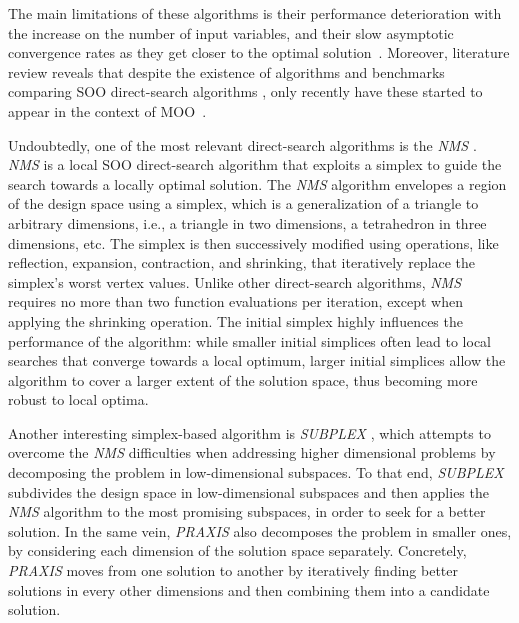 	The main limitations of these algorithms is their performance deterioration with the increase on the number of input variables, and their slow asymptotic convergence rates as they get closer to the optimal solution~\cite{Kolda2003}. Moreover, literature review reveals that despite the existence of algorithms and benchmarks comparing \ac{SOO} direct-search algorithms \cite{Waibel2018}, only recently have these started to appear in the context of \ac{MOO}~\cite{Custodio2010,Custodio2018}. 
	
	Undoubtedly, one of the most relevant direct-search algorithms is the \textit{\ac{NMS}} \cite{Nelder1964}. \textit{\ac{NMS}} is a local \ac{SOO} direct-search algorithm that exploits a simplex to guide the search towards a locally optimal solution. The \textit{\ac{NMS}} algorithm envelopes a region of the design space using a simplex, which is a generalization of a triangle to arbitrary dimensions, i.e., a triangle in two dimensions, a tetrahedron in three dimensions, etc. The simplex is then successively modified using operations, like reflection, expansion, contraction, and shrinking, that iteratively replace the simplex's worst vertex values. %
	Unlike other direct-search algorithms, \textit{\ac{NMS}} requires no more than two function evaluations per iteration, except when applying the shrinking operation. The initial simplex highly influences the performance of the algorithm: while smaller initial simplices often lead to local searches that converge towards a local optimum, larger initial simplices allow the algorithm to cover a larger extent of the solution space, thus becoming more robust to local optima.
	
	Another interesting simplex-based algorithm is \textit{SUBPLEX} \cite{Rowan1990}, which attempts to overcome the \textit{\ac{NMS}} difficulties when addressing higher dimensional problems by decomposing the problem in low\nobreakdash-\hspace{0pt}dimensional
	subspaces. To that end, \textit{SUBPLEX} subdivides the design space in low-dimensional subspaces and then applies the \textit{\ac{NMS}} algorithm to the most promising subspaces, in order to seek for a better solution. %
	In the same vein, \textit{\ac{PRAXIS}} \cite{Brent1973} also decomposes the problem in smaller ones, by considering each dimension of the solution space separately. Concretely, \textit{\ac{PRAXIS}} moves from one solution to another by iteratively finding better solutions in every other dimensions and then combining them into a candidate solution. 
	
